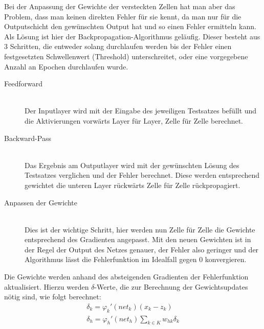 Bei der Anpassung der Gewichte der versteckten Zellen hat man aber das Problem, dass man keinen direkten Fehler für sie kennt, da man nur für die Outputschicht den gewünschten Output hat und so einen Fehler ermitteln kann. Als Lösung ist hier der Backpropagation-Algorithmus geläufig. Dieser besteht aus 3 Schritten, die entweder solang durchlaufen werden bis der Fehler einen festgesetzten Schwellenwert (Threshold) unterschreitet, oder eine vorgegebene Anzahl an Epochen durchlaufen wurde. 
\begin{description}	\item[Feedforward]\hfill \\
	Der Inputlayer wird mit der Eingabe des jeweiligen Testsatzes befüllt und die Aktivierungen vorwärts Layer für Layer, Zelle für Zelle berechnet.  
	\item[Backward-Pass]\hfill \\ 
	Das Ergebnis am Outputlayer wird mit der gewünschten Lösung des Testsatzes verglichen und der Fehler berechnet. Diese werden entsprechend gewichtet die unteren Layer rückwärts Zelle für Zelle rückpropagiert.
	\item[Anpassen der Gewichte]\hfill \\ Dies ist der wichtige Schritt, hier werden nun Zelle für Zelle die Gewichte entsprechend des Gradienten angepasst. Mit den neuen Gewichten ist in der Regel der Output des Netzes genauer, der Fehler also geringer und der Algorithmus lässt die Fehlerfunktion im Idealfall gegen 0 konvergieren. \cite{bib:aneuron}
\end{description}
Die Gewichte werden anhand des absteigenden Gradienten der Fehlerfunktion aktualisiert.  Hierzu werden \(\delta\)-Werte, die zur Berechnung der Gewichtsupdates nötig sind, wie folgt berechnet: 
\begin{gather}
\delta_{k} = \varphi_{k}'(net_{k})(x_{k}-z_{k}) \\
\delta_{h} = \varphi_{h}'(net_{h})\sum_{k\in K}w_{hk}\delta_{k} 
\end{gather}

